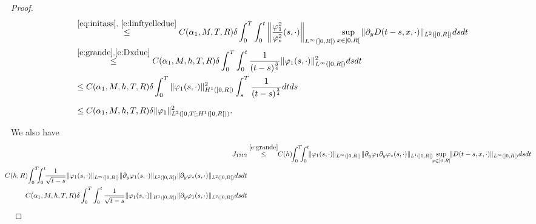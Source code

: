 \documentclass[11pt,leqno]{amsart}
\numberwithin{equation}{section}
\begin{document}
\begin{proof}
\begin{equation}
\begin{split}
    & \stackrel{\eqref{eq:initass},~\eqref{e:linftyelledue}}{\leq}
    C(\alpha_1, M, T, R) \delta \int_0^T \int_0^t \left\|
      \frac{{\varphi}_1^2}{{\varphi}_\ast^2} (s, \cdot) \right\|_{L^\infty(]0,
      R[)} \sup_{x \in ]0, R[} \|
    \partial_y D(t-s, x, \cdot)\|_{L^2 (]0, R[ )} ds
    dt 
    \\
    
    & \stackrel{\eqref{e:grande},\eqref{e:Dxdue}}{\leq} C(\alpha_1, M, h, T, R)
    \delta
    \int_0^T \int_0^t \frac{1}{(t-s)^{\frac{3}{4}}} \| {\varphi}_1 (s, \cdot) \|^2_{L^\infty (]0, R[)} ds dt 
    \\
    
    & \leq C(\alpha_1, M, h, T, R) \delta \int_0^T \| {\varphi}_1 (s, \cdot)
    \|^2_{H^1 (]0, R[)}
    \int_s^T \frac{1}{(t-s)^{\frac{3}{4}}} dt ds
    \\
    
    & \leq C(\alpha_1, M, h, T, R) \delta \| {\varphi}_1 \|^2_{L^2 (]0, T[; H^1 (]0,
      R[))}.  \phantom{\int}
  \end{split}
\end{equation}
We also have 
\begin{equation}
  \label{e:geiunodueunodue}
  \begin{split}
    J_{1212} & \stackrel{\eqref{e:grande}}{\leq} \!\!C(h)\!\! \int_0^T
    \!\!\!\int_0^t \!\!\| {\varphi}_1(s, \cdot) \|_{L^\infty (]0, R[)} \| \partial_y
    {\varphi}_1 \partial_y {\varphi}_\ast (s, \cdot) \|_{L^1 (]0, R[)}
    \!\!\sup_{x \in ]0, R[} \!\! \| D(t-s, x, \cdot ) \|_{L^\infty (]0, R[) } ds dt
    \\
  
    \!\!\!\!\!\!C(h, R)
    \!\int_0^T \!\!\!\int_0^t \!\!\frac{1}{\sqrt{t-s}} \| {\varphi}_1 (s, \cdot)
    \|_{L^\infty (]0, R[)} \| \partial_y {\varphi}_1 (s, \cdot) \|_{L^2
      (]0, R[)} \| \partial_y {\varphi}_\ast (s, \cdot) \|_{L^2 (]0, R[)}
    ds dt
    \\
   
    C(\alpha_1, M, h, T, R) \delta \int_0^T \int_0^t \frac{1}{\sqrt{t-s}} \|
    {\varphi}_1 (s, \cdot) \|_{H^1 (]0, R[)} \| \partial_y {\varphi}_1 (s,
    \cdot) \|_{L^2 (]0, R[)} ds dt
    \\
   

\end{split}
\end{equation}
\end{proof}
\end{document}

